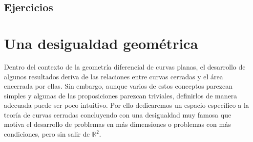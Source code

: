\documentclass[oneside,11pt]{memoir}
\begin{document}
\section{Ejercicios}

\chapter{Una desigualdad geométrica}
Dentro del contexto de la geometría diferencial de curvas planas, el desarrollo de algunos resultados deriva de las relaciones entre curvas cerradas y el área encerrada por ellas. Sin embargo, aunque varios de estos conceptos parezcan simples y algunas de las proposiciones parezcan triviales, definirlos de manera adecuada puede ser poco intuitivo. Por ello dedicaremos un espacio específico a la teoría de curvas cerradas concluyendo con una desigualdad muy famosa que motiva el desarrollo de problemas en más dimensiones o problemas con más condiciones, pero sin salir de $\mathbb{R}^2$.
\end{document}
